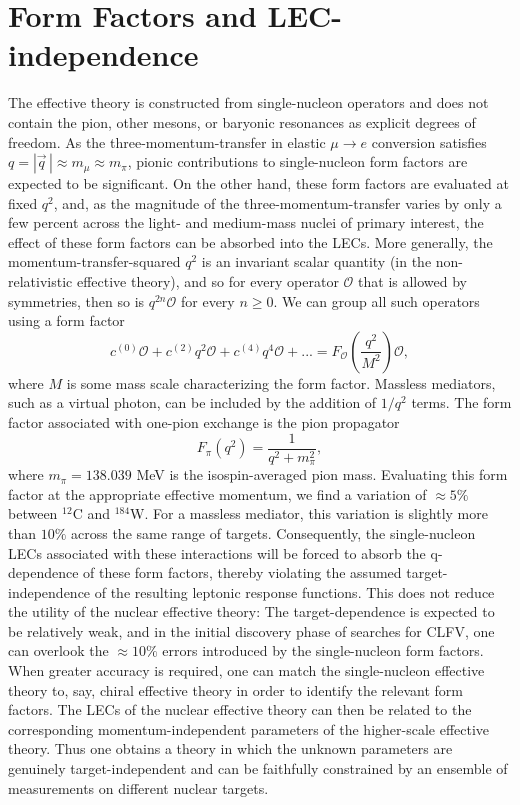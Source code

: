 \documentclass[12pt,letterpaper]{book}
\begin{document}
\section{Form Factors and LEC-independence}
\label{sec:form_factors}
The effective theory is constructed from single-nucleon operators and does not contain the pion, other mesons, or baryonic resonances as explicit degrees of freedom. As the three-momentum-transfer in elastic $\mu\rightarrow e$ conversion satisfies $q=|\vec{q}\,|\approx m_{\mu}\approx m_{\pi}$, pionic contributions to single-nucleon form factors are expected to be significant. On the other hand, these form factors are evaluated at fixed $q^2$, and, as the magnitude of the three-momentum-transfer varies by only a few percent across the light- and medium-mass nuclei of primary interest, the effect of these form factors can be absorbed into the LECs. More generally, the momentum-transfer-squared $q^2$ is an invariant scalar quantity (in the non-relativistic effective theory), and so for every operator $\mathcal{O}$ that is allowed by symmetries, then so is $q^{2n}\mathcal{O}$ for every $n\geq 0$. We can group all such operators using a form factor
\begin{equation}
c^{(0)}\mathcal{O}+c^{(2)} q^2\mathcal{O}+c^{(4)}q^4\mathcal{O}+...=F_{\mathcal{O}}\left(\frac{q^2}{M^2}\right)\mathcal{O},
\end{equation}
where $M$ is some mass scale characterizing the form factor. Massless mediators, such as a virtual photon, can be included by the addition of $1/q^2$ terms. The form factor associated with one-pion exchange is the pion propagator
\begin{equation}
F_{\pi}(q^2)=\frac{1}{q^2+m_{\pi}^2},
\end{equation}
where $m_{\pi}=138.039$ MeV is the isospin-averaged pion mass. Evaluating this form factor at the appropriate effective momentum, we find a variation of $\approx 5\%$ between $^{12}$C and $^{184}$W. For a massless mediator, this variation is slightly more than $10\%$ across the same range of targets. Consequently, the single-nucleon LECs associated with these interactions will be forced to absorb the q-dependence of these form factors, thereby violating the assumed target-independence of the resulting leptonic response functions. This does not reduce the utility of the nuclear effective theory: The target-dependence is expected to be relatively weak, and in the initial discovery phase of searches for CLFV, one can overlook the $\approx 10 \%$ errors introduced by the single-nucleon form factors. When greater accuracy is required, one can match the single-nucleon effective theory to, say, chiral effective theory in order to identify the relevant form factors. The LECs of the nuclear effective theory can then be related to the corresponding momentum-independent parameters of the higher-scale effective theory. Thus one obtains a theory in which the unknown parameters are genuinely target-independent and can be faithfully constrained by an ensemble of measurements on different nuclear targets. 
\end{document}
